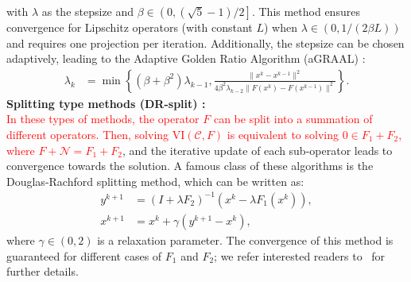 \documentclass[letterpaper, 10 pt, conference]{ieeeconf}  %
\newcommand{\red}[1]{\textcolor{red}{#1}}
\begin{document}
with \(\lambda\) as the stepsize and \(\beta \in \left(0, (\sqrt{5}-1)/2\right]\). This method ensures convergence for Lipschitz operators (with constant \(L\)) when \(\lambda \in (0, 1/(2\beta L))\) and requires one projection per iteration. Additionally, the stepsize can be chosen adaptively, leading to the Adaptive Golden Ratio Algorithm (aGRAAL) \cite{malitsky2020golden}: 
\begin{align*}
    \lambda_k &= \min\left\{(\beta + \beta^2)\lambda_{k-1}, \frac{\|x^k - x^{k-1}\|^2}{4\beta^2\lambda_{k-2}\|F(x^k) - F(x^{k-1})\|^2}\right\}.
\end{align*}
\textbf{Splitting type methods (DR-split) \cite{facchinei2003finite}:}\\
\red{In these types of methods, the operator \( F \) can be split into a summation of different operators. Then, solving \(\mathrm{VI}(\mathcal{C}, F)\) is equivalent to solving \(0 \in F_1 + F_2\), where \(F + \mathcal{N} = F_1 + F_2\)}, and the iterative update of each sub-operator leads to convergence towards the solution. A famous class of these algorithms is the Douglas-Rachford splitting method, which can be written as:
\begin{align*}
   y^{k+1} &= (I + \lambda F_2)^{-1}\left(x^k - \lambda F_1(x^k)\right), \\
   x^{k+1} &= x^k + \gamma(y^{k+1} - x^k),
\end{align*}
where $\gamma \in (0,2)$ is a relaxation parameter. The convergence of this method is guaranteed for different cases of $F_1$ and $F_2$; we refer interested readers to~\cite{giselsson2017tight,moursi1805douglas} for further details.
\end{document}
